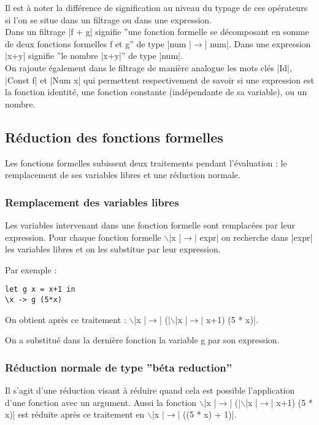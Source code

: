 \documentclass[a4paper, 12pt]{article}
\begin{document}
Il est à noter la différence de signification au niveau du typage de ces opérateurs si l'on se situe dans un filtrage ou dans une expression.\\
Dans un filtrage |f + g| signifie ''une fonction formelle se décomposant en somme de deux fonctions formelles f et g'' de type |num |$\rightarrow$| num|.
Dans une expression |x+y| signifie ''le nombre |x+y|'' de type |num|.\\



On rajoute également dans le filtrage de manière analogue les mots clés |Id|, |Const f| et |Num x| qui permettent respectivement de savoir si une expression est la fonction identité, une fonction constante (indépendante de sa variable), ou un nombre.



\subsection{Réduction des fonctions formelles}

Les fonctions formelles subissent deux traitements pendant l'évaluation : le remplacement de ses variables libres et une réduction normale.

\subsubsection{Remplacement des variables libres}

Les variables intervenant dans une fonction formelle sont remplacées par leur expression. Pour chaque fonction formelle $\backslash$|x |$\rightarrow$| expr| on recherche dans |expr| les variables libres et on les substitue par leur expression.

Par exemple :
\begin{lstlisting}
let g x = x+1 in
\x -> g (5*x)
\end{lstlisting}

On obtient après ce traitement : $\backslash$|x |$\rightarrow$| (|$\backslash$|x |$\rightarrow$| x+1) (5 * x)|.

On a substitué dans la dernière fonction la variable g par son expression.


\subsubsection{Réduction normale de type ''béta reduction''}

Il s'agit d'une réduction visant à réduire quand cela est possible l'application d'une fonction avec un argument. Aussi la fonction $\backslash$|x |$\rightarrow$| (|$\backslash$|x |$\rightarrow$| x+1) (5 * x)| est réduite après ce traitement en $\backslash$|x |$\rightarrow$| ((5 * x) + 1)|.
 
\end{document}
